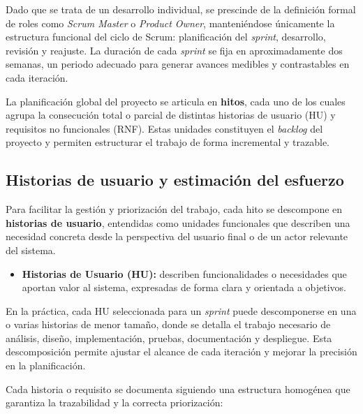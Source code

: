 \documentclass{report}
\begin{document}
Dado que se trata de un desarrollo individual, se prescinde de la definición formal de roles como \textit{Scrum Master} o \textit{Product Owner}, manteniéndose únicamente la estructura funcional del ciclo de Scrum: planificación del \textit{sprint}, desarrollo, revisión y reajuste. La duración de cada \textit{sprint} se fija en aproximadamente dos semanas, un periodo adecuado para generar avances medibles y contrastables en cada iteración.

La planificación global del proyecto se articula en \textbf{hitos}, cada uno de los cuales agrupa la consecución total o parcial de distintas historias de usuario (HU) y requisitos no funcionales (RNF). Estas unidades constituyen el \textit{backlog} del proyecto y permiten estructurar el trabajo de forma incremental y trazable.

\subsection{Historias de usuario y estimación del esfuerzo}

Para facilitar la gestión y priorización del trabajo, cada hito se descompone en \textbf{historias de usuario}, entendidas como unidades funcionales que describen una necesidad concreta desde la perspectiva del usuario final o de un actor relevante del sistema.

\begin{itemize}
    \item \textbf{Historias de Usuario (HU):} describen funcionalidades o necesidades que aportan valor al sistema, expresadas de forma clara y orientada a objetivos.
\end{itemize}

En la práctica, cada HU seleccionada para un \textit{sprint} puede descomponerse en una o varias historias de menor tamaño, donde se detalla el trabajo necesario de análisis, diseño, implementación, pruebas, documentación y despliegue. Esta descomposición permite ajustar el alcance de cada iteración y mejorar la precisión en la planificación.

Cada historia o requisito se documenta siguiendo una estructura homogénea que garantiza la trazabilidad y la correcta priorización:
\end{document}
